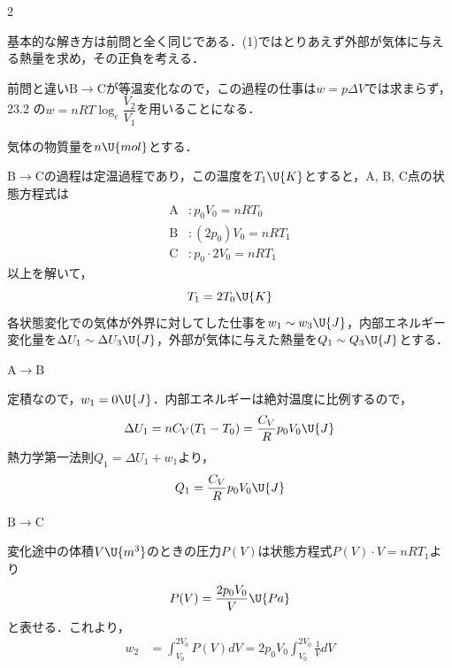 \begin{multicols}{2}
\par\nopagebreak
\begin{sisin}
基本的な解き方は前問と全く同じである．(1)ではとりあえず外部が気体に与える熱量を求め，その正負を考える．

前問と違い$\mathrm{B}\rightarrow\mathrm{C}$が等温変化なので，この過程の仕事は$w=p\Delta V$では求まらず，23.2 の$w=nRT\log_e\dfrac{V_2}{V_1}$を用いることになる．
\end{sisin}
\KaiHead
\begin{komon}
 気体の物質量を$n\U{mol}$とする．\par
       \hspace*{1zw}$\mathrm{B}\rightarrow\mathrm{C}$の過程は定温過程であり，この温度を$T_1\U{K}$とすると，$\mathrm{A}$, $\mathrm{B}$, $\mathrm{C}$点の状態方程式は
       \[\begin{aligned}
         \mathrm{A}&:p_0V_0=nRT_0\\
         \mathrm{B}&:(2p_0)V_0=nRT_1\\
         \mathrm{C}&:p_0\cdot 2V_0=nRT_1
       \end{aligned}\]
       以上を解いて，
       \[T_1=2T_0\U{K}\]
       各状態変化での気体が外界に対してした仕事を$w_1\sim w_3\U{J}$，内部エネルギー変化量を$\Delta U_1\sim\Delta U_3\U{J}$，外部が気体に与えた熱量を$Q_1\sim Q_3\U{J}$とする．
       \begin{list}{}{\setlength{\leftmargin}{1.2zw}\setlength{\itemsep}{0.3mm}\setlength{\topsep}{0.8mm}\setlength{\parsep}{0pt}}
       \item[・] $\mathrm{A}\rightarrow\mathrm{B}$
       \end{list}
       定積なので，$w_1=0\U{J}$．内部エネルギーは絶対温度に比例するので，
       \[\Delta U_1=nC_V(T_1-T_0)=\frac{C_V}{R}p_0V_0\U{J}\]
       熱力学第一法則$Q_1=\Delta U_1+w_1$より，
       \[Q_1=\frac{C_V}{R}p_0V_0\U{J}\]
       \begin{list}{}{\setlength{\leftmargin}{1.2zw}\setlength{\itemsep}{0.3mm}\setlength{\topsep}{0.8mm}\setlength{\parsep}{0pt}}
       \item[・] $\mathrm{B}\rightarrow\mathrm{C}$
       \end{list}
       変化途中の体積$V\U{m^3}$のときの圧力$P(V)$は状態方程式$P(V)\cdot V=nRT_1$より
       \[P(V)=\frac{2p_0V_0}{V}\U{Pa}\]
       と表せる．これより，
       \[\begin{aligned}
         w_2&=\int_{V_0}^{2V_0}P(V)dV=2p_0V_0\int_{V_0}^{2V_0}\frac{1}{V}dV\\

\end{aligned}\]
\end{komon}
\end{multicols}
